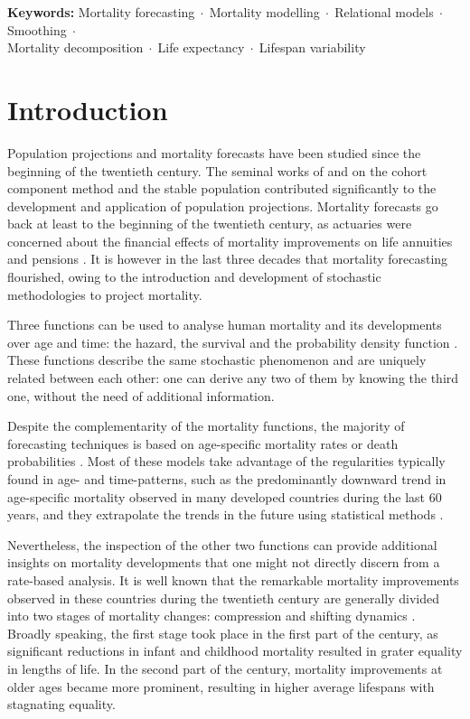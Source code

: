 \documentclass[11pt, a4paper]{article}
\begin{document}
\bigskip

\noindent \textbf{Keywords:} Mortality forecasting$\;\cdot\;$Mortality modelling$\;\cdot\;$Relational models$\;\cdot\;$Smoothing$\;\cdot\;$\\Mortality decomposition$\;\cdot\;$Life expectancy$\;\cdot\;$Lifespan variability

\section{Introduction}\label{Sec:Intro}

Population projections and mortality forecasts have been studied since the beginning of the twentieth century. The seminal works of \cite{whelpton1928population,whelpton1936empirical} and \cite{lotka1939theorie} on the cohort component method and the stable population contributed significantly to the development and application of population projections. Mortality forecasts go back at least to the beginning of the twentieth century, as actuaries were concerned about the financial effects of mortality improvements on life annuities and pensions \citep{pollard1987projection}. It is however in the last three decades that mortality forecasting flourished, owing to the introduction and development of stochastic methodologies to project mortality. 

Three functions can be used to analyse human mortality and its developments over age and time: the hazard, the survival and the probability density function \citep{klein2003survival}. These functions describe the same stochastic phenomenon and are uniquely related between each other: one can derive any two of them by knowing the third one, without the need of additional information. 

Despite the complementarity of the mortality functions, the majority of forecasting techniques is based on age-specific mortality rates or death probabilities \citep[for comprehensive reviews, see][]{booth2008mortality,cairns2009quantitative,shang2011point,stoeldraijer2013impact}. Most of these models take advantage of the regularities typically found in age- and time-patterns, such as the predominantly downward trend in age-specific mortality observed in many developed countries during the last 60 years, and they extrapolate the trends in the future using statistical methods \citep{haberman2011comparative}. 

Nevertheless, the inspection of the other two functions can provide additional insights on mortality developments that one might not directly discern from a rate-based analysis. It is well known that the remarkable mortality improvements observed in these countries during the twentieth century are generally divided into two stages of mortality changes: compression and shifting dynamics \cite[see, for example,][]{fries1980aging,wilmoth1999rectangularization,kannisto2000measuring,bongaarts2005long,canudas2008modal}. Broadly speaking, the first stage took place in the first part of the century, as significant reductions in infant and childhood mortality resulted in grater equality in lengths of life. In the second part of the century, mortality improvements at older ages became more prominent, resulting in higher average lifespans with stagnating equality. 
\end{document}
